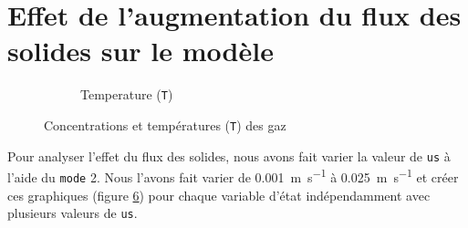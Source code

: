 \documentclass[11pt]{report}
\begin{document}
        \section{Effet de l'augmentation du flux des solides sur le modèle}
            \begin{figure}[ht]
                \centering
                \begin{subfigure}[t]{0.325\textwidth}
                    \centering
                    
                    \caption{}
                    \label{graph:con:2:CH4}
                \end{subfigure}
                \hfill
                \begin{subfigure}[t]{0.325\textwidth}
                    \centering
                    
                    \caption{}
                    \label{graph:con:2:H2}
                \end{subfigure}
                \hfill
                \begin{subfigure}[t]{0.325\textwidth}
                    \centering
                    
                    \caption{}
                    \label{graph:con:2:CO}
                \end{subfigure}
                \hfill
                \begin{subfigure}[t]{0.325\textwidth}
                    \centering
                    
                    \caption{}
                    \label{graph:con:2:CO2}
                \end{subfigure}
                \begin{subfigure}[t]{0.325\textwidth}
                    \centering
                    
                    \caption{Temperature (\texttt{T})}
                    \label{graph:con:2:T}
                \end{subfigure}
                \caption{Concentrations et températures (\texttt{T}) des gaz}
                \label{graph:con:2}
            \end{figure}
            Pour analyser l'effet du flux des solides,
            nous avons fait varier la valeur de \verb|us| à l'aide du \verb|mode| 2.
            Nous l'avons fait varier de \SI{0.001}{\meter\per\second} à \SI{0.025}{\meter\per\second}
            et créer ces graphiques (figure \ref{graph:con:2}) pour chaque variable d'état indépendamment avec plusieurs valeurs de \verb|us|.
\end{document}
